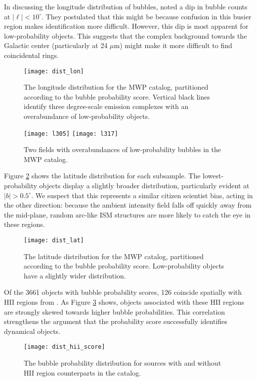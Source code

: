 \documentclass[preprint]{aastex}
\begin{document}
In discussing the longitude distribution of bubbles, \cite{Simpson12} noted a dip in bubble counts at $|\ell| < 10^\circ$. They postulated that this might be because confusion in this busier region makes identification more difficult. However, this dip is most apparent for low-probability objects. This suggests that the complex background towards the Galactic center (particularly at 24 $\mu$m) might make it more difficult to find coincidental rings.

\begin{figure}
\texttt{[image: dist\_lon]}
\caption{The longitude distribution for the MWP catalog, partitioned according to the bubble probability score.
Vertical black lines identify three degree-scale emission complexes with an overabundance of low-probability objects.}
\label{fig:lon}
\end{figure}


\begin{figure}
\texttt{[image: l305]}
\texttt{[image: l317]}
\caption{Two fields with overabundances of low-probability bubbles in the MWP catalog.}
\end{figure}

Figure \ref{fig:lat} shows the latitude distribution for each subsample. The lowest-probability objects display a slightly broader distribution, particularly evident at $|b| > 0.5^\circ$. We suspect that this represents a similar citizen scientist bias, acting in the other direction: because the ambient intensity field falls off quickly away from the mid-plane, random arc-like ISM structures are more likely to catch the eye in these regions. 

\begin{figure}
\texttt{[image: dist\_lat]}
\caption{The latitude distribution for the MWP catalog, partitioned according to the bubble probability score.
Low-probability objects have a slightly wider distribution.}
\label{fig:lat}
\end{figure}

Of the 3661 objects with bubble probability scores, 126 coincide spatially with HII regions from \cite{Anderson11}. As Figure \ref{fig:hii_score} shows, objects associated with these HII regions are strongly skewed towards higher bubble probabilities. This correlation strengthens the argument that the probability score successfully identifies dynamical objects.

\begin{figure}
\texttt{[image: dist\_hii\_score]}
\caption{The bubble probability distribution for sources with and without HII region counterparts in the \cite{Anderson11} catalog.}
\label{fig:hii_score}
\end{figure}
\end{document}

